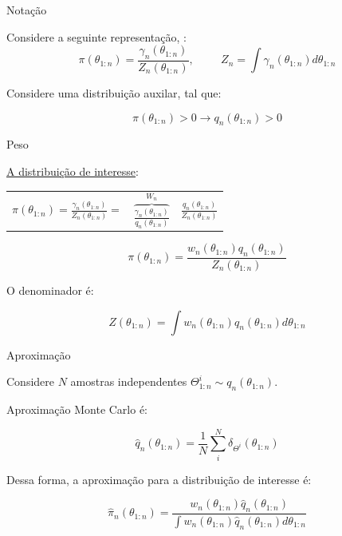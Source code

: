 \documentclass{beamer}
\begin{document}
\begin{frame}{Notação}

Considere a seguinte representação, \cite{doucet2}:
$$ \pi(\theta_{1:n}) = \frac{\gamma_n(\theta_{1:n})}{Z_n(\theta_{1:n})}, \hspace{1cm} Z_n = \int \gamma_n(\theta_{1:n}) d\theta_{1:n}$$

\pause

Considere uma distribuição auxilar, tal que:

$$ \pi(\theta_{1:n}) > 0 \rightarrow q_n(\theta_{1:n})>0$$


\end{frame}




\begin{frame}{Peso}

\underline{A distribuição de interesse}:
\begin{tabular}{ccc}
$ \pi(\theta_{1:n}) = \frac{\gamma_n(\theta_{1:n})}{Z_n(\theta_{1:n})}= $  & $ \overbrace{ \frac{\gamma_n(\theta_{1:n})}{q_n(\theta_{1:n})} }^{W_n} $  & $ \frac{q_n(\theta_{1:n})}{Z_n(\theta_{1:n})} $
\end{tabular}

\vspace{0.5cm}
$$ \pi(\theta_{1:n}) = \frac{w_n(\theta_{1:n})q_n(\theta_{1:n})}{Z_n(\theta_{1:n})} $$

\pause

O denominador é:

$$ Z(\theta_{1:n}) = \int w_n(\theta_{1:n})q_n(\theta_{1:n})d\theta_{1:n}$$

\end{frame}



\begin{frame}{Aproximação}

Considere $N$  amostras independentes $\Theta^i_{1:n} \sim q_n(\theta_{1:n})$.

\pause
\vspace{0.5cm}

Aproximação Monte Carlo é:

$$
\hat{q}_n(\theta_{1:n}) = \frac{1}{N} \sum^N_i \delta_{\Theta^i}(\theta_{1:n})
$$

\vspace{0.5cm}

Dessa forma, a aproximação para a distribuição de interesse é:

\pause

$$
\hat{\pi}_n(\theta_{1:n}) = \frac{w_n(\theta_{1:n})\hat{q}_n(\theta_{1:n})}{\int w_n(\theta_{1:n})\hat{q}_n(\theta_{1:n}) d\theta_{1:n}}
$$


\end{frame}
\end{document}
